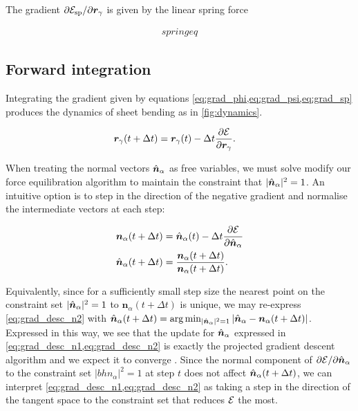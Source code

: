 The gradient $\partial \mathcal{E}_{\text{sp}} / \partial \bm{r}_\gamma$ is given by the linear spring force 

\begin{align}
	spring eq \label{eq:grad_sp}
\end{align}

\subsection{Forward integration}

Integrating the gradient given by equations \cref{eq:grad_phi,eq:grad_psi,eq:grad_sp} produces the dynamics of sheet bending as in \cref{fig:dynamics}. 

\begin{align}
	\bm{r}_\gamma(t+\Delta t) &= \bm{r}_\gamma (t) - \Delta t \frac{\partial \mathcal{E}}{\partial \bm{r}_\gamma}. \label{eq:grad_desc_r}
\end{align}

When treating the normal vectors $\hat{\bm{n}}_\alpha$ as free variables, we must solve modify our force equilibration algorithm to maintain the constraint that $| \hat{\bm{n}}_\alpha |^2 = 1$. 
An intuitive option is to step in the direction of the negative gradient and normalise the intermediate vectors at each step:

\begin{align}
	\bm{n}_\alpha(t+\Delta t) &= \hat{\bm{n}}_\alpha(t) - \Delta t \frac{\partial \mathcal{E}}{\partial \hat{\bm{n}}_\alpha} \label{eq:grad_desc_n1}\\
	\hat{\bm{n}}_\alpha(t+\Delta t) &= \frac{\bm{n}_\alpha(t+\Delta t)}{\bm{n}_\alpha(t+\Delta t)}. \label{eq:grad_desc_n2}
\end{align}

Equivalently, since for a sufficiently small step size the nearest point on the constraint set $|\hat{\bm{n}}_\alpha|^2=1$ to $\bm{n}_\alpha(t+\Delta t)$ is unique, we may re-express \cref{eq:grad_desc_n2} with $\hat{\bm{n}}_\alpha(t + \Delta t) = \arg \min_{|\hat{\bm{n}}_\alpha|^2 = 1} |\hat{\bm{n}}_\alpha - \bm{n}_\alpha(t+\Delta t)|$.
Expressed in this way, we see that the update for $\hat{\bm{n}}_\alpha$ expressed in \cref{eq:grad_desc_n1,eq:grad_desc_n2} is exactly the projected gradient descent algorithm and we expect it to converge \citep{eicke1992}.
Since the normal component of $\partial \mathcal{E} / \partial \hat{\bm{n}}_\alpha$ to the constraint set $|bh{n}_\alpha|^2 = 1$ at step $t$ does not affect $\hat{\bm{n}}_\alpha(t + \Delta t)$, we can interpret \cref{eq:grad_desc_n1,eq:grad_desc_n2} as taking a step in the direction of the tangent space to the constraint set that reduces $\mathcal{E}$ the most.

